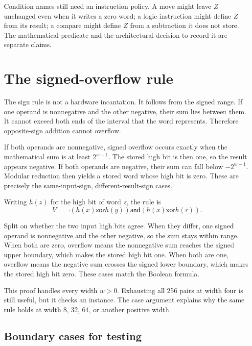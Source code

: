 Condition names still need an instruction policy. A move might leave \(Z\)
unchanged even when it writes a zero word; a logic instruction might define
\(Z\) from its result; a compare might define \(Z\) from a subtraction it
does not store. The mathematical predicate and the architectural decision to
record it are separate claims.

\section{The signed-overflow rule}

The sign rule is not a hardware incantation. It follows from the signed range.
If one operand is nonnegative and the other negative, their sum lies between
them. It cannot exceed both ends of the interval that the word represents. Therefore
opposite-sign addition cannot overflow.

If both operands are nonnegative, signed overflow occurs exactly when the
mathematical sum is at least \(2^{w-1}\). The stored high bit is then one, so
the result appears negative. If both operands are negative, their sum can fall
below \(-2^{w-1}\). Modular reduction then yields a stored word whose high bit
is zero. These are precisely the same-input-sign, different-result-sign cases.

Writing \(h(z)\) for the high bit of word \(z\), the rule is
\[
  V=\neg(h(x)\mathbin{\mathsf{xor}}h(y))
      \mathbin{\mathsf{and}}
      (h(x)\mathbin{\mathsf{xor}}h(r)).
\]

\begin{proofkit}[title={A reader proof of addition overflow}]
Split on whether the two input high bits agree. When they differ, one signed
operand is nonnegative and the other negative, so the sum stays within range.
When both are zero, overflow means the nonnegative sum reaches the signed upper
boundary, which makes the stored high bit one. When both are one, overflow
means the negative sum crosses the signed lower boundary, which makes the
stored high bit zero. These cases match the Boolean formula.
\end{proofkit}

This proof handles every width \(w>0\). Exhausting all 256 pairs at width four
is still useful, but it checks an instance. The case argument explains why the
same rule holds at width 8, 32, 64, or another positive width.

\subsection{Boundary cases for testing}

